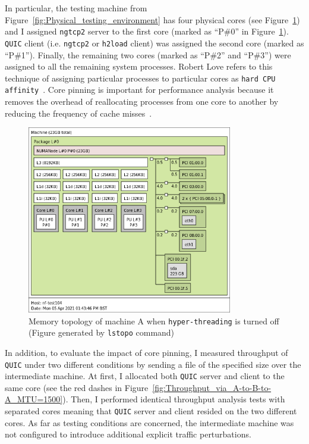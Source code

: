 \documentclass[12pt,a4paper,twoside,openright]{report}
\begin{document}
In particular, the testing machine from Figure~\ref{fig:Physical_testing_environment} has four physical cores (see Figure~\ref{fig:memory_topology}) and I assigned \texttt{ngtcp2} server to the first core (marked as \enquote{P\#0} in Figure~\ref{fig:memory_topology}).
\texttt{QUIC} client (i.e. \texttt{ngtcp2} or \texttt{h2load} client) was assigned the second core (marked as \enquote{P\#1}).
Finally, the remaining two cores (marked as \enquote{P\#2} and \enquote{P\#3}) were assigned to all the remaining system processes.
Robert Love refers to this technique of assigning particular processes to particular cores as \texttt{hard CPU affinity}~\cite{CPU_Affinity}.
Core pinning is important for performance analysis because it removes the overhead of reallocating processes from one core to another by reducing the frequency of cache misses~\cite{Tuning_10Gb_network_cards_on_Linux}.

    \begin{figure}[H]
    \centering
    \includegraphics[width=0.8\textwidth]{figs/memory_topology.png}
    \caption[Memory topology of machine A  when \texttt{hyper-threading} is turned off]{Memory topology of machine A  when \texttt{hyper-threading} is turned off (Figure generated by \texttt{lstopo} command)}
    \label{fig:memory_topology}
    \end{figure}

In addition, to evaluate the impact of core pinning, I measured throughput of \texttt{QUIC} under two different conditions by sending a file of the specified size over the intermediate machine.
At first, I allocated both \texttt{QUIC} server and client to the same core (see the red dashes in Figure~\ref{fig:Throughput_via_A-to-B-to-A_MTU=1500}).
Then, I performed identical throughput analysis tests with separated cores meaning that \texttt{QUIC} server and client resided on the two different cores.
As far as testing conditions are concerned, the intermediate machine was not configured to introduce additional explicit traffic perturbations.
\end{document}
